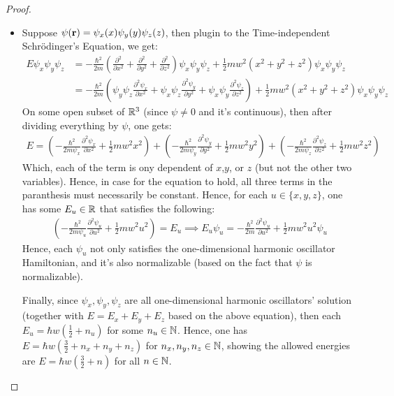 \documentclass{article}
\begin{document}
\begin{proof}

    \hfil

    \begin{itemize}
        \item[(a)] Suppose $\psi(\mathbf{r}) = \psi_x(x)\psi_y(y)\psi_z(z)$, then plugin to the Time-independent Schr\"odinger's Equation, we get:
        \begin{align}
            E\psi_x\psi_y\psi_z&= -\frac{\hbar^2}{2m}\left(\frac{\partial^2}{\partial x^2}+\frac{\partial^2}{\partial y^2}+\frac{\partial^2}{\partial z^2}\right)\psi_x\psi_y\psi_z + \frac{1}{2}mw^2(x^2+y^2+z^2)\psi_x\psi_y\psi_z\\
            &= -\frac{\hbar^2}{2m}\left(\psi_y\psi_z\frac{\partial^2\psi_x}{\partial x^2}+\psi_x\psi_z\frac{\partial^2\psi_y}{\partial y^2}+\psi_x\psi_y\frac{\partial^2\psi_z}{\partial z^2}\right)+ \frac{1}{2}mw^2(x^2+y^2+z^2)\psi_x\psi_y\psi_z
        \end{align}
        On some open subset of $\mathbb{R}^3$ (since $\psi\neq 0$ and it's continuous), then after dividing everything by $\psi$, one gets:
        \begin{align}
            E = \left(-\frac{\hbar^2}{2m\psi_x}\frac{\partial^2\psi_x}{\partial x^2} + \frac{1}{2}mw^2x^2\right)+\left(-\frac{\hbar^2}{2m\psi_y}\frac{\partial^2\psi_y}{\partial y^2} + \frac{1}{2}mw^2y^2\right)+\left(-\frac{\hbar^2}{2m\psi_z}\frac{\partial^2\psi_z}{\partial z^2} + \frac{1}{2}mw^2z^2\right)
        \end{align} 
        Which, each of the term is ony dependent of $x$,$y$, or $z$ (but not the other two variables). Hence, in case for the equation to hold, all three terms in the paranthesis must necessarily be constant. Hence, for each $u \in \{x,y,z\}$, one has some $E_u\in\mathbb{R}$ that satisfies the following:
        \begin{align}
            \left(-\frac{\hbar^2}{2m\psi_u}\frac{\partial^2\psi_u}{\partial u^2} + \frac{1}{2}mw^2u^2\right) = E_u \implies E_u \psi_u = -\frac{\hbar^2}{2m}\frac{\partial^2\psi_u}{\partial u^2}+\frac{1}{2}mw^2u^2\psi_u
        \end{align}
        Hence, each $\psi_u$ not only satisfies the one-dimensional harmonic oscillator Hamiltonian, and it's also normalizable (based on the fact that $\psi$ is normalizable). 

        Finally, since $\psi_x,\psi_y,\psi_z$ are all one-dimensional harmonic oscillators' solution (together with $E = E_x+E_y+E_z$ based on the above equation), then each $E_u =\hbar w\left(\frac{1}{2}+n_u\right)$ for some $n_u \in\mathbb{N}$. Hence, one has $E = \hbar w\left(\frac{3}{2}+n_x+n_y+n_z\right)$ for $n_x,n_y,n_z\in\mathbb{N}$, showing the allowed energies are $E = \hbar w\left(\frac{3}{2}+n\right)$ for all $n\in\mathbb{N}$.


\end{itemize}
\end{proof}
\end{document}
